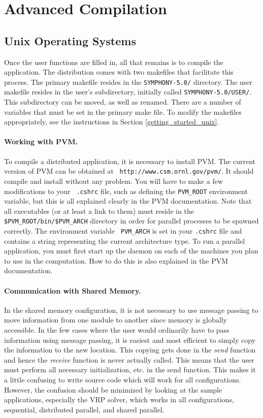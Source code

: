 \section{Advanced Compilation}
\label{advanced-compilation}

\subsection{Unix Operating Systems}

Once the user functions are filled in, all that remains is to compile the
application. The distribution comes with two makefiles that facilitate this
process. The primary makefile resides in the {\tt SYMPHONY-5.0/} directory.
The user makefile resides in the user's subdirectory, initially called
\texttt{SYMPHONY-5.0/USER/}. This subdirectory can be moved, as well as
renamed. There are a number of variables that must be set in the primary make
file. To modify the makefiles appropriately, see the instructions in Section
\ref{getting_started_unix}.

\paragraph{Working with PVM.}
\label{PVM}
To compile a distributed application, it is necessary to install PVM.
The current version of PVM can be obtained at {\tt
{}
{http://www.csm.ornl.gov/pvm/}}. It should compile and install without
any problem. You will have to make a few modifications to your {\tt
.cshrc} file, such as defining the {\tt PVM\_ROOT} environment
variable, but this is all explained clearly in the PVM documentation.
Note that all executables (or at least a link to them) must reside in
the {\tt \$PVM\_ROOT/bin/\$PVM\_ARCH} directory in order for parallel
processes to be spawned correctly. The environment variable {\tt
PVM\_ARCH} is set in your {\tt .cshrc} file and contains a string
representing the current architecture type. To run a parallel
application, you must first start up the daemon on each of the
machines you plan to use in the computation. How to do this is also
explained in the PVM documentation.

\paragraph{Communication with Shared Memory.}
\label{shared}
In the shared memory configuration, it is not necessary to use
message passing to move information from one module to another since
memory is globally accessible. In the few cases where the user would
ordinarily have to pass information using message passing, it is
easiest and most efficient to simply copy the information to the new
location. This copying gets done in the {\em send} function and hence
the {\em receive} function is never actually called. This means that
the user must perform all necessary initialization, etc. in the send
function. This makes it a little confusing to write source code which
will work for all configurations. However, the confusion should be
minimized by looking at the sample applications, especially the VRP solver,
which works in all configurations, sequential, distributed parallel, and
shared parallel. 


